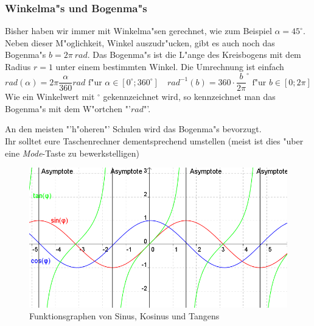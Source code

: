 \subsubsection{Winkelma"s und Bogenma"s}
Bisher haben wir immer mit Winkelma"sen gerechnet, wie zum Beispiel $\alpha = 45^\circ$. Neben dieser M"oglichkeit, Winkel auszudr"ucken, gibt es auch noch das Bogenma"s $b = 2\pi \ rad$. Das Bogenma"s ist die L"ange des Kreisbogens mit dem Radius $r = 1$ unter einem bestimmten Winkel. Die Umrechnung ist einfach
\begin{equation*}
rad(\alpha) = 2\pi \frac{\alpha}{360} rad \text{ f"ur } \alpha \in \left[ 0^\circ;360^\circ \right] \quad rad^{-1}(b) = 360 \cdot {\frac{b}{2\pi}}^\circ \text{ f"ur } b \in \left[0;2\pi\right]
\end{equation*}
Wie ein Winkelwert mit $^\circ$ gekennzeichnet wird, so kennzeichnet man das Bogenma"s mit dem W"ortchen "'$rad$"'.
\begin{warning}
	An den meisten "'h"oheren"' Schulen wird das Bogenma"s bevorzugt.\\
	Ihr solltet eure Taschenrechner dementsprechend umstellen (meist ist dies "uber eine \textit{Mode}-Taste zu bewerkstelligen)
\end{warning}

\begin{figure}[h!]
\includegraphics[width = 13 cm, height = 5 cm]{pictures/Winkelfunktionen}
\caption{Funktionsgraphen von Sinus, Kosinus und Tangens}
\end{figure}

